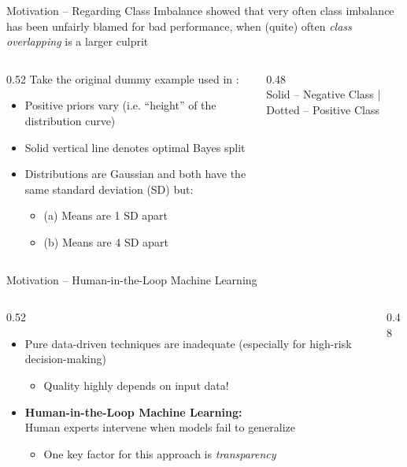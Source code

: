 \begin{frame}{Motivation -- Regarding Class Imbalance}
  \citet{prati2004} showed that very often class imbalance has been unfairly blamed for bad performance, when (quite) often \emph{class overlapping} is a larger culprit
  \begin{columns}[T]
    \begin{column}{0.52\textwidth}
      \hspace{0.05em} Take the original dummy example used in \cite{prati2004}:
      \begin{itemize}
      \item Positive priors vary (i.e. ``height'' of the distribution curve)
      \item Solid vertical line denotes optimal Bayes split
      \item Distributions are Gaussian and both have the same standard deviation (SD) but:
        \begin{itemize}
        \item (a) Means are 1 SD apart
        \item (b) Means are 4 SD apart
        \end{itemize}
      \end{itemize}
    \end{column}
    \begin{column}{0.48\textwidth}
      $\quad$ \\ [0.5cm]
      \footnotesize Solid -- Negative Class | Dotted -- Positive Class
      \\ [0.5cm]
      \resizebox{\linewidth}{!}{}
    \end{column}
    \end{columns}
\end{frame}

\begin{frame}{Motivation -- Human-in-the-Loop Machine Learning}
  \begin{columns}[T]
    \begin{column}{0.52\textwidth}
      \begin{itemize}
      \item Pure data-driven techniques are inadequate (especially for high-risk decision-making) \cite{maadi2021}
        \begin{itemize}
          \item Quality highly depends on input data!
        \end{itemize}
      \item \textbf{Human-in-the-Loop Machine Learning:}\\Human experts intervene when models fail to generalize
        \begin{itemize}
        \item One key factor for this approach is \emph{transparency}
        \end{itemize}
      \end{itemize}
    \end{column}
    \begin{column}{0.48\textwidth}
    \end{column}
  \end{columns}
\end{frame}

